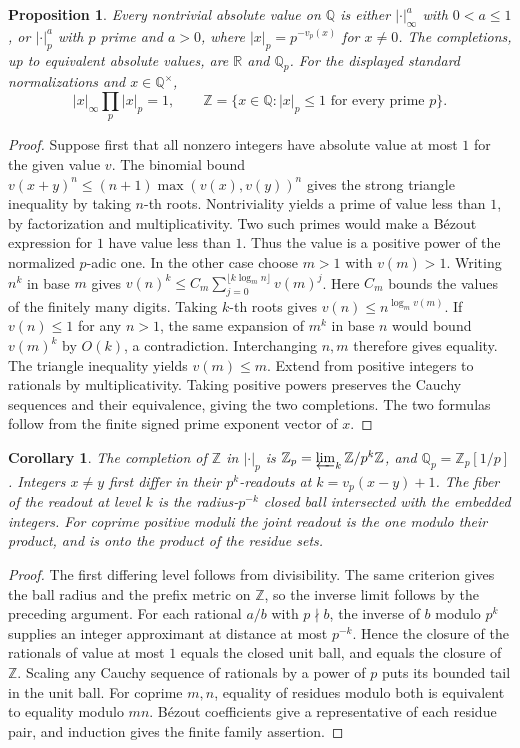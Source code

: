 \documentclass[11pt,reqno]{amsart}
\newtheorem{proposition}[theorem]{Proposition}
\newtheorem{corollary}[theorem]{Corollary}
\theoremstyle{definition}
\theoremstyle{remark}
\numberwithin{equation}{section}
\newcommand{\R}{\mathbb{R}}
\newcommand{\Q}{\mathbb{Q}}
\newcommand{\Z}{\mathbb{Z}}
\begin{document}
\begin{proposition}\label{m9:absolute}
Every nontrivial absolute value on \(\Q\) is either
\(|\cdot|_\infty^a\) with \(0<a\le1\), or
\(|\cdot|_p^a\) with \(p\) prime and \(a>0\), where
\(|x|_p=p^{-v_p(x)}\) for \(x\ne0\).
The completions, up to equivalent absolute values, are
\(\R\) and \(\Q_p\). For the displayed standard normalizations
and \(x\in\Q^\times\),
\[
 |x|_\infty\prod_{p}|x|_p=1,\qquad
 \Z=\{x\in\Q:|x|_p\le1\text{ for every prime }p\}.
\]
\end{proposition}
\begin{proof}
Suppose first that all nonzero integers have absolute value at
most \(1\) for the given value \(v\). The binomial bound
\(v(x+y)^n\le(n+1)\max(v(x),v(y))^n\) gives the strong
triangle inequality by taking \(n\)-th roots.
Nontriviality yields a prime of value less than \(1\), by
factorization and multiplicativity. Two such primes would make
a B\'ezout expression for \(1\) have value less than \(1\).
Thus the value is a positive power of the normalized \(p\)-adic
one. In the other case choose \(m>1\) with \(v(m)>1\).
Writing \(n^k\) in base \(m\) gives
\(v(n)^k\le C_m\sum_{j=0}^{\lfloor k\log_m n\rfloor}v(m)^j\).
Here \(C_m\) bounds the values of the finitely many digits.
Taking \(k\)-th roots gives
\(v(n)\le n^{\log_m v(m)}\). If \(v(n)\le1\)
for any \(n>1\), the same expansion of \(m^k\) in base \(n\)
would bound \(v(m)^k\) by \(O(k)\), a contradiction.
Interchanging \(n,m\) therefore gives equality.
The triangle inequality yields \(v(m)\le m\).
Extend from positive integers to rationals by multiplicativity.
Taking positive powers preserves the Cauchy sequences and their
equivalence, giving the two completions. The two formulas follow
from the finite signed prime exponent vector of \(x\).
\end{proof}

\begin{corollary}\label{m9:padic}
The completion of \(\Z\) in \(|\cdot|_p\) is
\(\Z_p=\varprojlim_k\Z/p^k\Z\), and \(\Q_p=\Z_p[1/p]\).
Integers \(x\ne y\) first differ in their \(p^k\)-readouts at
\(k=v_p(x-y)+1\). The fiber of the readout at level \(k\) is the
radius-\(p^{-k}\) closed ball intersected with the embedded integers.
For coprime positive moduli the joint readout is the one modulo
their product, and is onto the product of the residue sets.
\end{corollary}
\begin{proof}
The first differing level follows from divisibility. The same
criterion gives the ball radius and the prefix metric on \(\Z\),
so the inverse limit follows by the preceding argument.
For each rational \(a/b\) with \(p\nmid b\), the inverse of \(b\)
modulo \(p^k\) supplies an integer approximant at distance at
most \(p^{-k}\). Hence the closure of the rationals of value at
most \(1\) equals the closed unit ball, and equals the closure
of \(\Z\). Scaling any Cauchy sequence of rationals by a power
of \(p\) puts its bounded tail in the unit ball.
For coprime \(m,n\), equality of residues modulo both is
equivalent to equality modulo \(mn\). B\'ezout coefficients give
a representative of each residue pair, and induction gives
the finite family assertion.
\end{proof}
\end{document}
